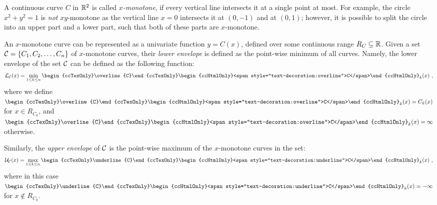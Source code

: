 
A continuous curve $C$ in $\mathbb{R}^2$ is called {\em $x$-monotone}, if
every vertical line intersects it at a single point at most. For
example, the circle $x^2 + y^2 = 1$ is {\em not} $xy$-monotone as the
vertical line $x = 0$ intersects it at $(0, -1)$ and at $(0, 1)$;
however, it is possible to split the circle into an upper part and a
lower part, such that both of these parts are $x$-monotone.

An $x$-monotone curve can be represented as a univariate function
$y = C(x)$, defined over some continuous range $R_C \subseteq \mathbb{R}$.
Given a set ${\cal C} = \{ C_1, C_2, \ldots, C_n \}$ of $x$-monotone
curves, their {\em lower envelope} is defined as the point-wise minimum of
all curves. Namely, the lower envelope of the set ${\cal C}$ can be
defined as the following function:
\begin{eqnarray*}
\calL_{\calC} (x) = \min_{1 \leq k \leq n}{
\begin{ccTexOnly}\overline{C}\end{ccTexOnly}
\begin{ccHtmlOnly}<span style="text-decoration:overline">C</span>\end{ccHtmlOnly}
_k (x)} \ ,
\end{eqnarray*}
where we define $
\begin{ccTexOnly}\overline{C}\end{ccTexOnly}
\begin{ccHtmlOnly}<span style="text-decoration:overline">C</span>\end{ccHtmlOnly}
_k(x) = C_k(x)$ for $x \in R_{C_k}$,
and $
\begin{ccTexOnly}\overline{C}\end{ccTexOnly}
\begin{ccHtmlOnly}<span style="text-decoration:overline">C</span>\end{ccHtmlOnly}
_k(x) = \infty$ otherwise.

Similarly, the {\em upper envelope} of ${\cal C}$ is the point-wise maximum of
the $x$-monotone curves in the set:
\begin{eqnarray*}
\calU_{\calC} (x) = \max_{1 \leq k \leq n}{
\begin{ccTexOnly}\underline{C}\end{ccTexOnly}
\begin{ccHtmlOnly}<span style="text-decoration:underline">C</span>\end{ccHtmlOnly}
_k (x)} \ ,
\end{eqnarray*}
where in this case $
\begin{ccTexOnly}\underline{C}\end{ccTexOnly}
\begin{ccHtmlOnly}<span style="text-decoration:underline">C</span>\end{ccHtmlOnly}
_k(x) = -\infty$ for $x 
\not\in R_{C_k}$.


